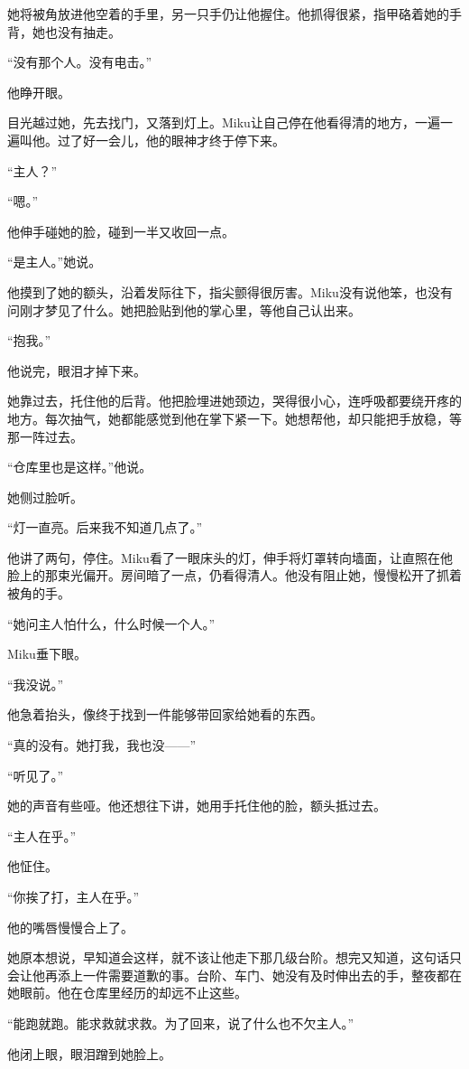 她将被角放进他空着的手里，另一只手仍让他握住。他抓得很紧，指甲硌着她的手背，她也没有抽走。

“没有那个人。没有电击。”

他睁开眼。

目光越过她，先去找门，又落到灯上。Miku让自己停在他看得清的地方，一遍一遍叫他。过了好一会儿，他的眼神才终于停下来。

“主人？”

“嗯。”

他伸手碰她的脸，碰到一半又收回一点。

“是主人。”她说。

他摸到了她的额头，沿着发际往下，指尖颤得很厉害。Miku没有说他笨，也没有问刚才梦见了什么。她把脸贴到他的掌心里，等他自己认出来。

“抱我。”

他说完，眼泪才掉下来。

她靠过去，托住他的后背。他把脸埋进她颈边，哭得很小心，连呼吸都要绕开疼的地方。每次抽气，她都能感觉到他在掌下紧一下。她想帮他，却只能把手放稳，等那一阵过去。

“仓库里也是这样。”他说。

她侧过脸听。

“灯一直亮。后来我不知道几点了。”

他讲了两句，停住。Miku看了一眼床头的灯，伸手将灯罩转向墙面，让直照在他脸上的那束光偏开。房间暗了一点，仍看得清人。他没有阻止她，慢慢松开了抓着被角的手。

“她问主人怕什么，什么时候一个人。”

Miku垂下眼。

“我没说。”

他急着抬头，像终于找到一件能够带回家给她看的东西。

“真的没有。她打我，我也没——”

“听见了。”

她的声音有些哑。他还想往下讲，她用手托住他的脸，额头抵过去。

“主人在乎。”

他怔住。

“你挨了打，主人在乎。”

他的嘴唇慢慢合上了。

她原本想说，早知道会这样，就不该让他走下那几级台阶。想完又知道，这句话只会让他再添上一件需要道歉的事。台阶、车门、她没有及时伸出去的手，整夜都在她眼前。他在仓库里经历的却远不止这些。

“能跑就跑。能求救就求救。为了回来，说了什么也不欠主人。”

他闭上眼，眼泪蹭到她脸上。

